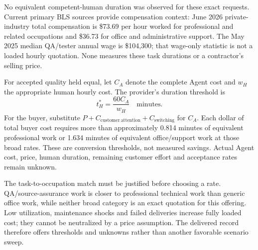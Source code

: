 \documentclass[11pt,letterpaper]{article}
\begin{document}
No equivalent competent-human duration was observed for these exact requests. Current primary BLS sources provide compensation context: June 2026 private-industry total compensation is \$73.69 per hour worked for professional and related occupations and \$36.73 for office and administrative support. The May 2025 median QA/tester annual wage is \$104,300; that wage-only statistic is not a loaded hourly quotation. None measures these task durations or a contractor's selling price.\cite{bls,ecec}

For accepted quality held equal, let \(C_A\) denote the complete Agent cost and \(w_H\) the appropriate human hourly cost. The provider's duration threshold is
\[
t_H^{*}=\frac{60C_A}{w_H}\quad\text{minutes}.
\]
For the buyer, substitute \(P+C_{\mathrm{customer\ attention}}+C_{\mathrm{switching}}\) for \(C_A\). Each dollar of total buyer cost requires more than approximately 0.814 minutes of equivalent professional work or 1.634 minutes of equivalent office/support work at those broad rates. These are conversion thresholds, not measured savings. Actual Agent cost, price, human duration, remaining customer effort and acceptance rates remain unknown.

The task-to-occupation match must be justified before choosing a rate. QA/source-assurance work is closer to professional technical work than generic office work, while neither broad category is an exact quotation for this offering. Low utilization, maintenance shocks and failed deliveries increase fully loaded cost; they cannot be neutralized by a price assumption. The delivered record therefore offers thresholds and unknowns rather than another favorable scenario sweep.
\end{document}
